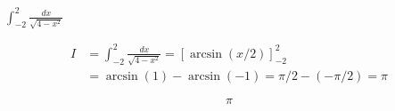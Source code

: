$\displaystyle \int_{-2}^{2} \frac{dx}{\sqrt{4-x^2}}$

\nopagebreak
\begin{align*}
I &= \int_{-2}^{2} \frac{dx}{\sqrt{4-x^2}} = [\arcsin(x/2)]_{-2}^{2} \\
&= \arcsin(1) - \arcsin(-1) = \pi/2 - (-\pi/2) = \pi
\end{align*}

\[
\boxed{\displaystyle \pi}
\]
